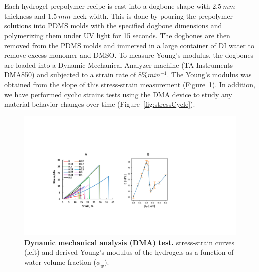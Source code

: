 \section{}
Each hydrogel prepolymer recipe is cast into a dogbone shape with $2.5~mm$ thickness and $1.5~mm$ neck width. This is done by pouring the prepolymer solutions into PDMS molds with the specified dogbone dimensions and polymerizing them under UV light for 15 seconds. The dogbones are then removed from the PDMS molds and immersed in a large container of DI water to remove excess monomer and DMSO. To measure Young’s modulus, the dogbones are loaded into a Dynamic Mechanical Analyzer machine (TA Instruments DMA850) and subjected to a strain rate of $8\% min^{-1}$. The Young’s modulus was obtained from the slope of this stress-strain measurement (Figure~\ref{fig:DMA}). In addition, we have performed cyclic strains tests using the DMA device to study any material behavior changes over time (Figure~\ref{fig:stressCycle}).

\begin{figure}[!th]
      \centering
      \includegraphics[width=\textwidth]{DMA.pdf}
      \caption[]{\textbf{Dynamic mechanical analysis (DMA) test.} stress-strain curves (left) and derived Young’s modulus of the hydrogels as a function of water volume fraction ($\phi_{w}$).}
      \label{fig:DMA}
\end{figure}

